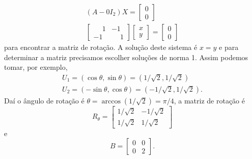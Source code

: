 \begin{exemplos}
\begin{enumerate}
\begin{solucao}
                  \begin{align*}
                      (A - 0I_2)X = \begin{bmatrix}
                                        0 \\0
                                    \end{bmatrix} \\
                      \begin{bmatrix}
                          \phantom{-}1 & -1           \\
                          -1           & \phantom{-}1
                      \end{bmatrix} \begin{bmatrix}
                                        x \\y
                                    \end{bmatrix} = \begin{bmatrix}
                                                        0 \\0
                                                    \end{bmatrix}
                  \end{align*}
                  para encontrar a matriz de rotação. A solução deste sistema é $x = y$ e para determinar a matriz precisamos escolher soluções de norma 1.
                  Assim podemos tomar, por exemplo,
                  \begin{align*}
                      U_1 = (\cos\theta, \sin\theta) = (1/\sqrt{2}, 1/\sqrt{2}) \\
                      U_2 = (-\sin\theta, \cos\theta) = (-1/\sqrt{2}, 1/\sqrt{2}).
                  \end{align*}
                  Daí o ângulo de rotação é $\theta = \arccos(1/\sqrt{2}) = \pi/4$, a matriz de rotação é
                  \[
                      R_\theta = \begin{bmatrix}
                          1/\sqrt{2} & -1/\sqrt{2} \\
                          1/\sqrt{2} & 1/\sqrt{2}
                      \end{bmatrix}
                  \]
                  e
                  \[
                      B = \begin{bmatrix}
                          0 & 0 \\
                          0 & 2
                      \end{bmatrix}.
                  \]

\end{solucao}
\end{enumerate}
\end{exemplos}
